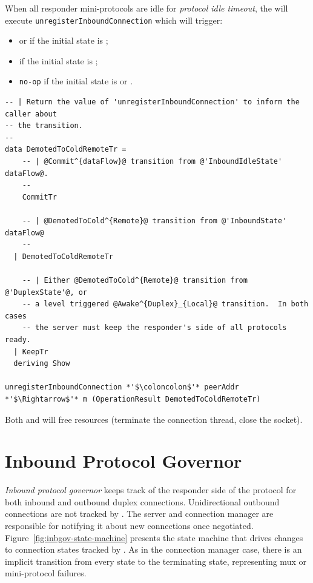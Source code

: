 When all responder mini-protocols are idle for \textit{protocol idle timeout},
the \inbgov{} will execute \texttt{unregisterInboundConnection} which will trigger:
\begin{itemize}
  \item \CommitUniRem{} or \CommitDupRem{} if the initial state is
    \InboundIdleStateDup{};
  \item \TimeoutExpired{}  if the initial state is \OutboundStateDupTau{};
  \item \texttt{no-op}  if the initial state is \OutboundStateDup{} or \OutboundIdleStateAny{}.
\end{itemize}

\begin{lstlisting}
-- | Return the value of 'unregisterInboundConnection' to inform the caller about
-- the transition.
--
data DemotedToColdRemoteTr =
    -- | @Commit^{dataFlow}@ transition from @'InboundIdleState' dataFlow@.
    --
    CommitTr

    -- | @DemotedToCold^{Remote}@ transition from @'InboundState' dataFlow@
    --
  | DemotedToColdRemoteTr

    -- | Either @DemotedToCold^{Remote}@ transition from @'DuplexState'@, or
    -- a level triggered @Awake^{Duplex}_{Local}@ transition.  In both cases
    -- the server must keep the responder's side of all protocols ready.
  | KeepTr
  deriving Show

unregisterInboundConnection *'$\coloncolon$'* peerAddr *'$\Rightarrow$'* m (OperationResult DemotedToColdRemoteTr)
\end{lstlisting}
Both \CommitUniRem{} and \CommitDupRem{} will free resources (terminate the
connection thread, close the socket).


\section{Inbound Protocol Governor}
\textit{Inbound protocol governor} keeps track of the responder side of the protocol for
both inbound and outbound duplex connections.  Unidirectional outbound
connections are not tracked by \inbgov{}.  The server and connection manager
are responsible for notifying it about new connections once negotiated.
Figure~\ref{fig:inbgov-state-machine} presents the state machine that drives
changes to connection states tracked by \inbgov{}.  As in the connection
manager case, there is an implicit transition from every state to the
terminating state, representing mux or mini-protocol failures.

